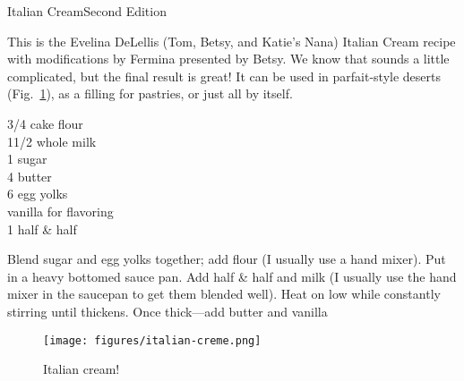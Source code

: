 \begin{entry}{Italian Cream}{Second Edition}

\begin{open}
    This is the Evelina DeLellis (Tom, Betsy, and Katie's Nana) Italian Cream
    recipe with modifications by Fermina presented by Betsy.  We know that
    sounds a little complicated, but the final result is great!  It can be used
    in parfait-style deserts (Fig.~\ref{fig:italian-cream}), as a filling for
    pastries, or just all by itself.
\end{open}
\begin{ingredients}
    \SI{3/4}{\cup} cake flour\\
    1\SI{1/2}{\cup} whole milk\\
    \SI{1}{\cup} sugar\\
    \SI{4}{\teaspoon} butter\\
    6 egg yolks\\
    vanilla for flavoring\\
    \SI{1}{\quart} half \& half
\end{ingredients}
Blend sugar and egg yolks together; add flour (I usually use a hand mixer). Put
in a heavy bottomed sauce pan. Add half \& half and milk (I usually use the hand
mixer in the saucepan to get them blended well). Heat on low while constantly
stirring until thickens. Once thick---add butter and vanilla

\begin{figure}[b]
    \centering
    \texttt{[image: figures/italian-creme.png]}
    \caption{Italian cream!}
    \label{fig:italian-cream}
\end{figure}
\end{entry}

